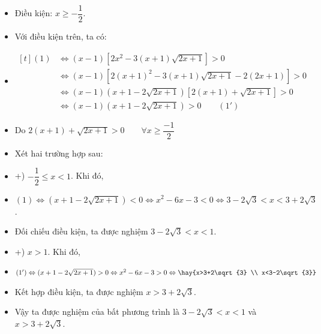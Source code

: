  \lgi 
 \begin{itemize}[label=,leftmargin=*]
\item Điều kiện: $x\ge -\dfrac{1}{2}$.
\item Với điều kiện trên, ta có:
\item $\begin{aligned}[t] (1) &\Leftrightarrow (x-1)[2x^2-3(x+1)\sqrt{2x+1}]>0 \\
  &\Leftrightarrow(x-1)[2(x+1)^2-3(x+1)\sqrt{2x+1} - 2(2x+1)]>0 \\
&\Leftrightarrow(x-1)(x+1-2\sqrt{2x+1})[2(x+1)+\sqrt{2x+1}]>0 \\
&\Leftrightarrow (x-1)(x+1-2\sqrt{2x+1}) >0 \qquad (1')
\end{aligned}$
\item Do $2(x+1)+\sqrt{2x+1}>0 \qquad \forall x \ge \dfrac{-1}{2}$
\item Xét hai trường hợp sau:
\item +) $-\dfrac{1}{2}\le x<1	$. Khi đó,
\item  $(1)\Leftrightarrow(x+1-2\sqrt{2x+1}) <0 
\Leftrightarrow x^2-6x-3<0 \Leftrightarrow 3-2\sqrt{3}<x<3+2\sqrt{3}$.
\item Đối chiếu điều kiện, ta được nghiệm $3-2\sqrt{3}<x<1$.
\item +) 	$x>1$. Khi đó,
\item  $(1')\Leftrightarrow (x+1-2\sqrt{2x+1}) >0 
\Leftrightarrow x^2-6x-3>0 
\Leftrightarrow \hay{x>3+2\sqrt{3} \\ x<3-2\sqrt{3}}$
\item Kết hợp điều kiện, ta được nghiệm $x>3+2\sqrt{3}$.
\item Vậy ta được nghiệm của bất phương trình là $3-2\sqrt{3}<x<1$ và 
 $x>3+2\sqrt{3}$.
 \end{itemize}


